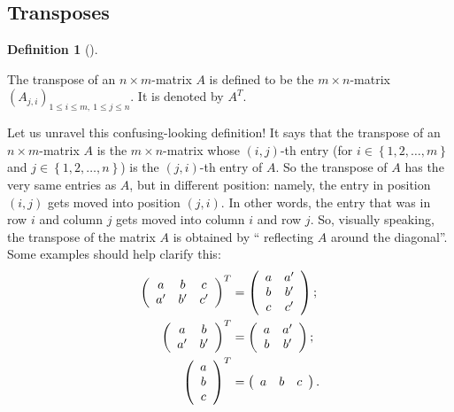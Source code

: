 \documentclass[numbers=enddot,12pt,final,onecolumn,notitlepage]{scrartcl}%
\theoremstyle{definition}
\newtheorem{defi}[theo]{Definition}
\newenvironment{definition}[1][]
{\begin{defi}[#1]\begin{leftbar}}
{\end{leftbar}\end{defi}}
\begin{document}
\subsection{Transposes}

\begin{definition}
The transpose of an $n\times m$-matrix $A$ is defined to be the $m\times
n$-matrix $\left(  A_{j,i}\right)  _{1\leq i\leq m,\ 1\leq j\leq n}$. It is
denoted by $A^{T}$.
\end{definition}

Let us unravel this confusing-looking definition! It says that the transpose
of an $n\times m$-matrix $A$ is the $m\times n$-matrix whose $\left(
i,j\right)  $-th entry (for $i\in\left\{  1,2,\ldots,m\right\}  $ and
$j\in\left\{  1,2,\ldots,n\right\}  $) is the $\left(  j,i\right)  $-th entry
of $A$. So the transpose of $A$ has the very same entries as $A$, but in
different position: namely, the entry in position $\left(  i,j\right)  $ gets
moved into position $\left(  j,i\right)  $. In other words, the entry that was
in row $i$ and column $j$ gets moved into column $i$ and row $j$. So, visually
speaking, the transpose of the matrix $A$ is obtained by \textquotedblleft
reflecting $A$ around the diagonal\textquotedblright. Some examples should
help clarify this:%
\begin{align*}
\left(
\begin{array}
[c]{ccc}%
a & b & c\\
a^{\prime} & b^{\prime} & c^{\prime}%
\end{array}
\right)  ^{T}  &  =\left(
\begin{array}
[c]{cc}%
a & a^{\prime}\\
b & b^{\prime}\\
c & c^{\prime}%
\end{array}
\right)  ;\\
\left(
\begin{array}
[c]{cc}%
a & b\\
a^{\prime} & b^{\prime}%
\end{array}
\right)  ^{T}  &  =\left(
\begin{array}
[c]{cc}%
a & a^{\prime}\\
b & b^{\prime}%
\end{array}
\right)  ;\\
\left(
\begin{array}
[c]{c}%
a\\
b\\
c
\end{array}
\right)  ^{T}  &  =\left(
\begin{array}
[c]{ccc}%
a & b & c
\end{array}
\right)  .
\end{align*}
\end{document}
